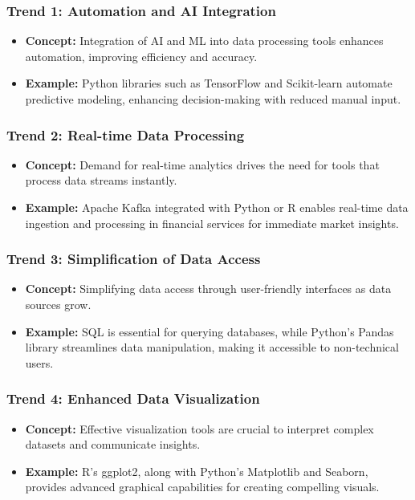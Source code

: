\documentclass[aspectratio=169]{beamer}
\begin{document}
\begin{frame}[fragile]
    \frametitle{Trend 1: Automation and AI Integration}
    \begin{itemize}
        \item \textbf{Concept:} Integration of AI and ML into data processing tools enhances automation, improving efficiency and accuracy.
        \item \textbf{Example:} Python libraries such as TensorFlow and Scikit-learn automate predictive modeling, enhancing decision-making with reduced manual input.
    \end{itemize}
\end{frame}

\begin{frame}[fragile]
    \frametitle{Trend 2: Real-time Data Processing}
    \begin{itemize}
        \item \textbf{Concept:} Demand for real-time analytics drives the need for tools that process data streams instantly.
        \item \textbf{Example:} Apache Kafka integrated with Python or R enables real-time data ingestion and processing in financial services for immediate market insights.
    \end{itemize}
\end{frame}

\begin{frame}[fragile]
    \frametitle{Trend 3: Simplification of Data Access}
    \begin{itemize}
        \item \textbf{Concept:} Simplifying data access through user-friendly interfaces as data sources grow.
        \item \textbf{Example:} SQL is essential for querying databases, while Python's Pandas library streamlines data manipulation, making it accessible to non-technical users.
    \end{itemize}
\end{frame}

\begin{frame}[fragile]
    \frametitle{Trend 4: Enhanced Data Visualization}
    \begin{itemize}
        \item \textbf{Concept:} Effective visualization tools are crucial to interpret complex datasets and communicate insights.
        \item \textbf{Example:} R’s ggplot2, along with Python’s Matplotlib and Seaborn, provides advanced graphical capabilities for creating compelling visuals.
    \end{itemize}
\end{frame}
\end{document}
